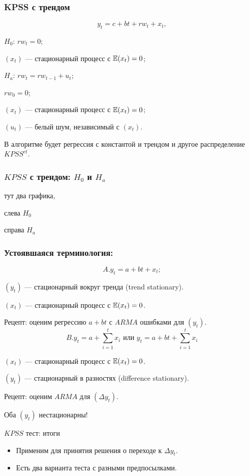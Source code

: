   
  \begin{frame}
    \frametitle{KPSS с трендом}
    \[
      y_t = c + bt + rw_t + x_t,
    \]
  
    \pause
  
    \alert{$H_0$: $rw_t = 0$};
    
    $(x_t)$ — стационарный процесс с $\mathbb{E}(x_t) = 0$;
    
    \pause
  
    \alert{$H_a$: $rw_t = rw_{t-1} + u_t$};

    $rw_0 = 0$;
  
    $(x_t)$ — стационарный процесс с $\mathbb{E}(x_t) = 0$;

    $(u_t)$ — белый шум, независимый с $(x_t)$.
  
    \pause 
  
    В алгоритме будет регрессия \alert{с константой и трендом} и другое распределение $KPSS^{ct}$.
  
  \end{frame}
  
  
  \begin{frame}
    \frametitle{$KPSS$ с трендом: $H_0$ и $H_a$}
  
  
    тут два графика,
  
  
    слева $H_0$
  
  
    справа $H_a$
  
  
  \end{frame}
  
  \begin{frame}
    \frametitle{Устоявшаяся терминология:}
    \[
      A. y_t = a + bt + x_t;
    \]

    $(y_t)$ — \alert{стационарный вокруг тренда} (trend stationary).

    $(x_t)$ — стационарный процесс с $\mathbb{E}(x_t) = 0$.

    \pause Рецепт: оценим регрессию $a + bt$ с $ARMA$ ошибками для $(y_t)$.
    \pause 
    \[
      B. y_t = a + \sum_{i=1}^t x_i \text{ или } y_t = a + bt + \sum_{i=1}^t x_i
    \]

    $(x_t)$ — стационарный процесс с $\mathbb{E}(x_t) = 0$.

    $(y_t)$ — \alert{стационарный в разностях} (difference stationary).

    \pause Рецепт: оценим $ARMA$ для $(\Delta y_t)$.

    \pause Оба $(y_t)$ нестационарны!
    
  \end{frame}


  
  \begin{frame}{$KPSS$ тест: итоги}
  
    \begin{itemize}[<+->]
      \item Применим для принятия решения о переходе к $\Delta y_t$.
      \item Есть два варианта теста с разными предпосылками.
    \end{itemize}
  \end{frame}
  
  
  
  
